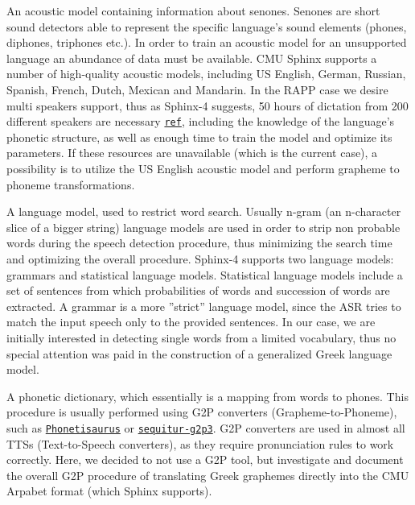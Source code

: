 \begin{DoxyItemize}
\item An acoustic model containing information about senones. Senones are short sound detectors able to represent the specific language's sound elements (phones, diphones, triphones etc.). In order to train an acoustic model for an unsupported language an abundance of data must be available. C\-M\-U Sphinx supports a number of high-\/quality acoustic models, including U\-S English, German, Russian, Spanish, French, Dutch, Mexican and Mandarin. In the R\-A\-P\-P case we desire multi speakers support, thus as Sphinx-\/4 suggests, 50 hours of dictation from 200 different speakers are necessary \href{http://cmusphinx.sourceforge.net/wiki/tutorialam}{\tt ref}, including the knowledge of the language's phonetic structure, as well as enough time to train the model and optimize its parameters. If these resources are unavailable (which is the current case), a possibility is to utilize the U\-S English acoustic model and perform grapheme to phoneme transformations.
\item A language model, used to restrict word search. Usually n-\/gram (an n-\/character slice of a bigger string) language models are used in order to strip non probable words during the speech detection procedure, thus minimizing the search time and optimizing the overall procedure. Sphinx-\/4 supports two language models\-: grammars and statistical language models. Statistical language models include a set of sentences from which probabilities of words and succession of words are extracted. A grammar is a more ''strict'' language model, since the A\-S\-R tries to match the input speech only to the provided sentences. In our case, we are initially interested in detecting single words from a limited vocabulary, thus no special attention was paid in the construction of a generalized Greek language model.
\item A phonetic dictionary, which essentially is a mapping from words to phones. This procedure is usually performed using G2\-P converters (Grapheme-\/to-\/\-Phoneme), such as \href{https://code.google.com/p/phonetisaurus/}{\tt Phonetisaurus} or \href{http://www-i6.informatik.rwth-aachen.de/web/Software/g2p.html}{\tt sequitur-\/g2p3}. G2\-P converters are used in almost all T\-T\-Ss (Text-\/to-\/\-Speech converters), as they require pronunciation rules to work correctly. Here, we decided to not use a G2\-P tool, but investigate and document the overall G2\-P procedure of translating Greek graphemes directly into the C\-M\-U Arpabet format (which Sphinx supports).
\end{DoxyItemize}

